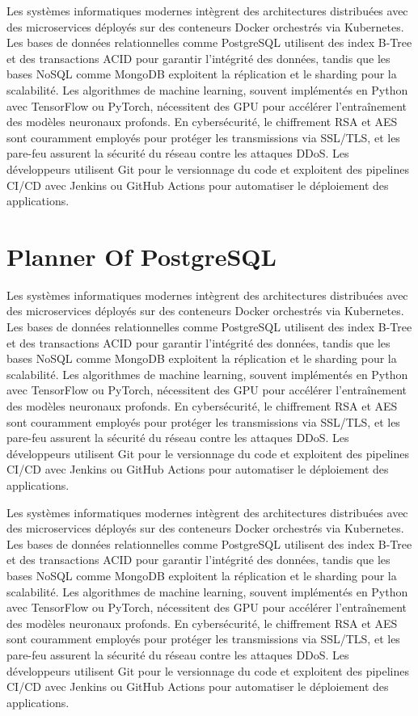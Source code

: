

Les systèmes informatiques modernes intègrent des architectures distribuées avec des microservices déployés sur des conteneurs Docker orchestrés via Kubernetes. Les bases de données relationnelles comme PostgreSQL utilisent des index B-Tree et des transactions ACID pour garantir l'intégrité des données, tandis que les bases NoSQL comme MongoDB exploitent la réplication et le sharding pour la scalabilité. Les algorithmes de machine learning, souvent implémentés en Python avec TensorFlow ou PyTorch, nécessitent des GPU pour accélérer l'entraînement des modèles neuronaux profonds. En cybersécurité, le chiffrement RSA et AES sont couramment employés pour protéger les transmissions via SSL/TLS, et les pare-feu assurent la sécurité du réseau contre les attaques DDoS. Les développeurs utilisent Git pour le versionnage du code et exploitent des pipelines CI/CD avec Jenkins ou GitHub Actions pour automatiser le déploiement des applications.

\section{Planner Of PostgreSQL}
\label{sec:pg-planner}
Les systèmes informatiques modernes intègrent des architectures distribuées avec des microservices déployés sur des conteneurs Docker orchestrés via Kubernetes. Les bases de données relationnelles comme PostgreSQL utilisent des index B-Tree et des transactions ACID pour garantir l'intégrité des données, tandis que les bases NoSQL comme MongoDB exploitent la réplication et le sharding pour la scalabilité. Les algorithmes de machine learning, souvent implémentés en Python avec TensorFlow ou PyTorch, nécessitent des GPU pour accélérer l'entraînement des modèles neuronaux profonds. En cybersécurité, le chiffrement RSA et AES sont couramment employés pour protéger les transmissions via SSL/TLS, et les pare-feu assurent la sécurité du réseau contre les attaques DDoS. Les développeurs utilisent Git pour le versionnage du code et exploitent des pipelines CI/CD avec Jenkins ou GitHub Actions pour automatiser le déploiement des applications.



Les systèmes informatiques modernes intègrent des architectures distribuées avec des microservices déployés sur des conteneurs Docker orchestrés via Kubernetes. Les bases de données relationnelles comme PostgreSQL utilisent des index B-Tree et des transactions ACID pour garantir l'intégrité des données, tandis que les bases NoSQL comme MongoDB exploitent la réplication et le sharding pour la scalabilité. Les algorithmes de machine learning, souvent implémentés en Python avec TensorFlow ou PyTorch, nécessitent des GPU pour accélérer l'entraînement des modèles neuronaux profonds. En cybersécurité, le chiffrement RSA et AES sont couramment employés pour protéger les transmissions via SSL/TLS, et les pare-feu assurent la sécurité du réseau contre les attaques DDoS. Les développeurs utilisent Git pour le versionnage du code et exploitent des pipelines CI/CD avec Jenkins ou GitHub Actions pour automatiser le déploiement des applications.

